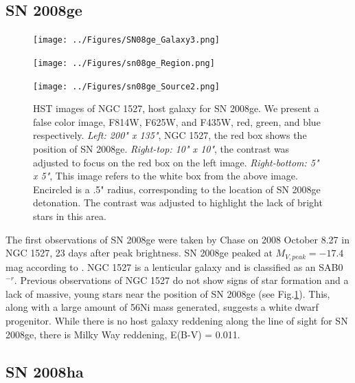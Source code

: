 \documentclass[preprint]{aastex}
\begin{document}
\subsection{SN 2008ge}
\begin{centering}
	\begin{figure}
	\begin{minipage}[c][7cm]{.5\textwidth}
		\vspace*{\fill}
		\centering
		\texttt{[image: ../Figures/SN08ge\_Galaxy3.png]}
			\label{fig:08gegal}
	\end{minipage}
	\begin{minipage}[c][7cm]{.5\textwidth}
		\vspace*{-.5cm}
		\centering
		\hspace*{1.48cm}\texttt{[image: ../Figures/sn08ge\_Region.png]}
			\label{fig:r08ge}\par%
		\hspace*{1.45cm}\texttt{[image: ../Figures/sn08ge\_Source2.png]}
			\label{fig:s08ge}
	\end{minipage}
	\caption{HST images of NGC 1527, host galaxy for SN 2008ge. We present a false color image,
	 F814W, F625W, and F435W, red, green, and blue respectively. \textit{Left: 200" x 135"}, NGC 1527,
	 the red box shows the position of SN 2008ge. \textit{Right-top: 10" x 10"}, the contrast was adjusted
	 to focus on the red box on the left image. \textit{Right-bottom: 5" x 5"},
	This image refers to the white box from the above image. 
	Encircled is a .5" radius, corresponding to the location of SN 2008ge detonation. The
	contrast was adjusted to highlight the lack of bright stars in this area. }
	\label{fig:08ge_whole}
	\end{figure}  
\end{centering}


The first observations of SN 2008ge were taken by
Chase on 2008 October 8.27 in NGC 1527, 23 days after peak brightness\citep{pig08}. 
SN 2008ge peaked at $M_{V,peak} = -17.4$ mag according to \citet{fol1011}.
NGC 1527 is a lenticular galaxy and is classified as an SAB0$^{-r}$.
 Previous observations of NGC 1527 do not show signs of star formation and a lack of massive, young stars near the
 position of SN 2008ge (see Fig.\ref{fig:08ge_whole}).
This, along with a large amount of 56Ni mass generated, \citet{fol1011} suggests a
white dwarf progenitor.
While there is no host galaxy reddening along the line of sight for SN 2008ge, there is 
Milky Way reddening, E(B-V) = 0.011. 


\subsection{SN 2008ha}
\end{document}
